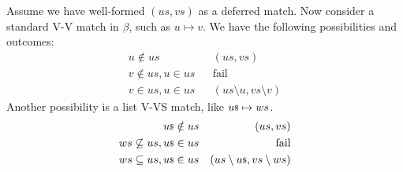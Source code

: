 Assume we have well-formed $(us,vs)$ as a deferred match.
Now consider a standard V-V match in $\beta$, such as $u \mapsto v$.
We have the following possibilities and outcomes:
\begin{eqnarray*}
   u \notin us  && (us,vs)
\\ v \notin us, u \in us && \mbox{fail}
\\ v \in us, u \in us && (us \setminus u, vs \setminus v)
\end{eqnarray*}
Another possibility is a list V-VS match, like ${u}{\scriptstyle\$} \mapsto ws$.
\begin{eqnarray*}
   {u}{\scriptstyle\$} \notin us  && (us,vs)
\\ ws \not\subseteq us, {u}{\scriptstyle\$} \in us && \mbox{fail}
\\ ws \subseteq us, {u}{\scriptstyle\$} \in us && (us \setminus {u}{\scriptstyle\$}, vs \setminus ws)
\end{eqnarray*}